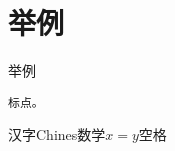 \documentclass[11pt]{article}
\begin{document}
  \section{举例} 举例
   \begin{verbatim}
标点。
\end{verbatim}
汉字Chines数学$x=y$空格
\end{document}
